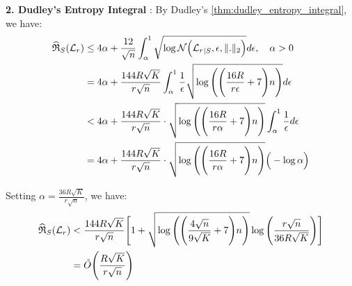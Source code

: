 \noindent \textbf{2. Dudley's Entropy Integral} : By Dudley's \ref{thm:dudley_entropy_integral}, we have:
\begin{align*}
    \widehat{\mathfrak{R}}_S(\mathcal{L}_r) &\le 4\alpha + \frac{12}{\sqrt n}\int_\alpha^1 \sqrt{\log \mathcal{N}\Big( {\mathcal{L}_r}_{|S}, \epsilon, \|.\|_2 \Big)}d\epsilon, \ \ \ \alpha > 0 \\
    &= 4\alpha + \frac{144R\sqrt K}{r\sqrt n} \int_\alpha^1 \frac{1}{\epsilon}\sqrt{
        \log\Bigg( 
            \Bigg( \frac{16R}{r\epsilon} + 7 \Bigg)n
         \Bigg) 
    }d\epsilon \\
    &< 4\alpha + \frac{144R\sqrt K}{r\sqrt n}\cdot\sqrt{
        \log\Bigg( 
            \Bigg( \frac{16R}{r\alpha} + 7 \Bigg)n
         \Bigg) 
    }\int_{\alpha}^1 \frac{1}{\epsilon}d\epsilon \\
    &= 4\alpha + \frac{144R\sqrt K}{r\sqrt n}\cdot\sqrt{
        \log\Bigg( 
            \Bigg( \frac{16R}{r\alpha} + 7 \Bigg)n
         \Bigg) 
    }\Big( -\log\alpha \Big)
\end{align*}

\noindent Setting $\alpha = \frac{36R\sqrt{K}}{r\sqrt n}$, we have:
\begin{align*}
    \widehat{\mathfrak{R}}_S(\mathcal{L}_r) &< \frac{144R\sqrt K}{r\sqrt n}\Bigg[ 1 + \sqrt{
        \log\Bigg( 
            \Bigg( \frac{4\sqrt n}{9\sqrt K} + 7 \Bigg)n
         \Bigg) 
    }\log\Bigg( \frac{r\sqrt{n}}{36R\sqrt K} \Bigg) \Bigg] \\
    &= \tilde O\Bigg( 
        \frac{R\sqrt K}{r\sqrt n}
     \Bigg)
\end{align*}

